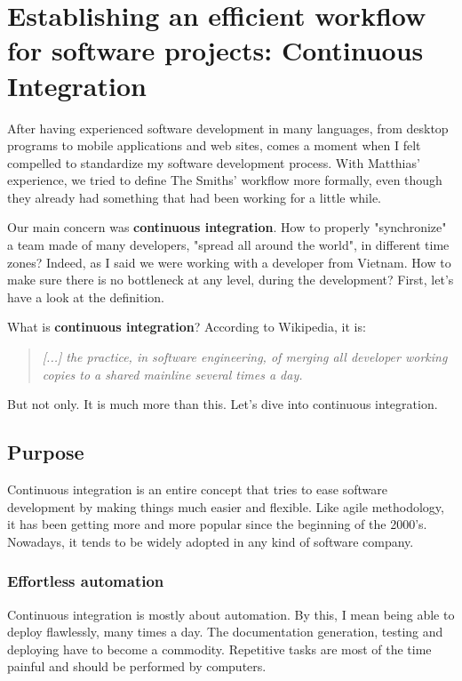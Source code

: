 \chapter[Continuous Integration]{Establishing an efficient workflow for software projects: Continuous Integration}

After having experienced software development in many languages, from desktop programs to mobile applications and web sites, comes a moment when I felt compelled to standardize my software development process. With Matthias' experience, we tried to define The Smiths' workflow more formally, even though they already had something that had been working for a little while.

\medskip

Our main concern was \textbf{continuous integration}. How to properly "synchronize" a team made of many developers, "spread all around the world", in different time zones? Indeed, as I said we were working with a developer from Vietnam. How to make sure there is no bottleneck at any level, during the development? First, let's have a look at the definition.

\medskip

\noindent What is \textbf{continuous integration}? According to Wikipedia, it is:

\begin{quote}
\textit{[...] the practice, in software engineering, of merging all developer working copies to a shared mainline several times a day.}
\end{quote}
But not only. It is much more than this. Let's dive into continuous integration.

\section{Purpose}

Continuous integration is an entire concept that tries to ease software development by making things much easier and flexible. Like agile methodology, it has been getting more and more popular since the beginning of the 2000's. Nowadays, it tends to be widely adopted in any kind of software company.

\subsection{Effortless automation}

Continuous integration is mostly about automation. By this, I mean being able to deploy flawlessly, many times a day. The documentation generation, testing and deploying have to become a commodity. Repetitive tasks are most of the time painful and should be performed by computers.

